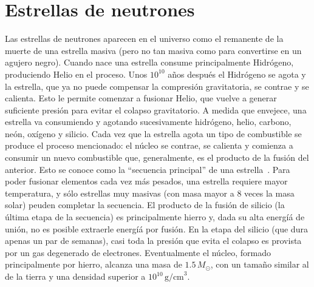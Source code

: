 \section{Estrellas de neutrones}\label{sc:intro}

Las estrellas de neutrones aparecen en el universo como el remanente de la muerte de una estrella masiva (pero no tan masiva como para convertirse en un agujero negro).
Cuando nace una estrella consume principalmente Hidrógeno, produciendo Helio en el proceso.
Unos $10^{10}$ años después el Hidrógeno se agota y la estrella, que ya no puede compensar la compresión gravitatoria, se contrae y se calienta.
Esto le permite comenzar a fusionar Helio, que vuelve a generar suficiente presión para evitar el colapso gravitatorio.
A medida que envejece, una estrella va consumiendo y agotando sucesivamente hidrógeno, helio, carbono, neón, oxígeno y silicio.
Cada vez que la estrella agota un tipo de combustible se produce el proceso mencionado: el núcleo se contrae, se calienta y comienza a consumir un nuevo combustible que, generalmente, es el producto de la fusión del anterior.
Esto se conoce como la ``secuencia principal'' de una estrella~\cite{woosley_physics_2005}.
Para poder fusionar elementos cada vez más pesados, una estrella requiere mayor temperatura, y sólo estrellas muy masivas (con masa mayor a 8 veces la masa solar) peuden completar la secuencia.
El producto de la fusión de silicio (la última etapa de la secuencia) es principalmente hierro y, dada su alta energíá de unión, no es posible extraerle energíá por fusión.
En la etapa del silicio (que dura apenas un par de semanas), casi toda la presión que evita el colapso es provista por un gas degenerado de electrones.
Eventualmente el núcleo, formado principalmente por hierro, alcanza una masa de $1.5\,M_\odot$, con un tamaño similar al de la tierra y una densidad superior a $10^{10}\,\text{g/cm}^{3}$.

